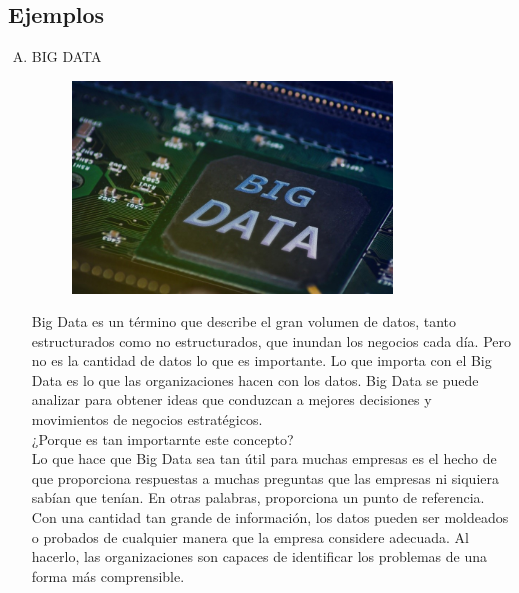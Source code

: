 \documentclass[preprint,12pt]{elsarticle}
\begin{document}
	
	
	\newpage
	
	\subsection{Ejemplos \\}
		
		\begin{enumerate}[A)]
			\item BIG DATA 
			
			\begin{figure}[htb]
				\begin{center}
					\includegraphics[width=8.5cm]{./Imagenes/img1}
				\end{center}
			\end{figure}
		
			Big Data es un término que describe el gran volumen de datos, tanto estructurados como no estructurados, que inundan los negocios cada día. Pero no es la cantidad de datos lo que es importante. Lo que importa con el Big Data es lo que las organizaciones hacen con los datos. Big Data se puede analizar para obtener ideas que conduzcan a mejores decisiones y movimientos de negocios estratégicos.\cite{bib03:BA:Online} \\ 
			
			¿Porque es tan importarnte este concepto?\\
			
			Lo que hace que Big Data sea tan útil para muchas empresas es el hecho de que proporciona respuestas a muchas preguntas que las empresas ni siquiera sabían que tenían. En otras palabras, proporciona un punto de referencia. Con una cantidad tan grande de información, los datos pueden ser moldeados o probados de cualquier manera que la empresa considere adecuada. Al hacerlo, las organizaciones son capaces de identificar los problemas de una forma más comprensible.\\
			

\end{enumerate}
\end{document}
